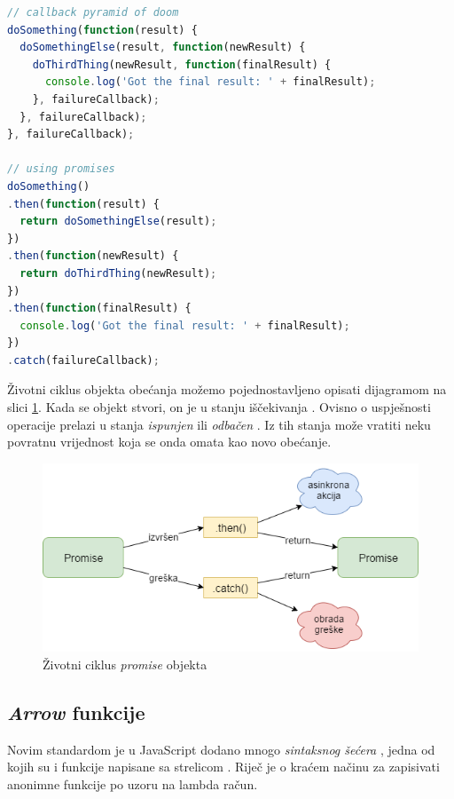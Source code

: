 \documentclass[times, utf8, zavrsni, numeric]{fer}
\newcommand{\razmakp}{\vspace{18pt}}
\newcommand{\razmaks}{\vspace{10pt}}
\begin{document}
\razmakp
\begin{lstlisting}[language=JavaScript, caption={Korištenje obećanja umjesto ugnježđivanja funkcija povratnog poziva}, label={lst:callback_vs_promises}]
// callback pyramid of doom
doSomething(function(result) {
  doSomethingElse(result, function(newResult) {
    doThirdThing(newResult, function(finalResult) {
      console.log('Got the final result: ' + finalResult);
    }, failureCallback);
  }, failureCallback);
}, failureCallback);

// using promises
doSomething()
.then(function(result) {
  return doSomethingElse(result);
})
.then(function(newResult) {
  return doThirdThing(newResult);
})
.then(function(finalResult) {
  console.log('Got the final result: ' + finalResult);
})
.catch(failureCallback);
\end{lstlisting}
\razmaks

Životni ciklus objekta obećanja možemo pojednostavljeno opisati dijagramom na slici \ref{fig:promise_lifecycle}.
Kada se objekt stvori, on je u stanju iščekivanja .
Ovisno o uspješnosti operacije prelazi u stanja \emph{ispunjen}  ili \emph{odbačen} .
Iz tih stanja može vratiti neku povratnu vrijednost koja se onda omata kao novo obećanje.

\begin{figure}[htb]
\centering
\includegraphics[width=14cm]{img/promise.png}
\caption{Životni ciklus \emph{promise} objekta}
\label{fig:promise_lifecycle}
\end{figure}

\razmakp


\subsection{\emph{Arrow} funkcije}

Novim standardom je u JavaScript dodano mnogo \emph{sintaksnog šećera} , jedna od kojih su i funkcije napisane sa strelicom .
Riječ je o kraćem načinu za zapisivati anonimne funkcije po uzoru na lambda račun.
\end{document}
